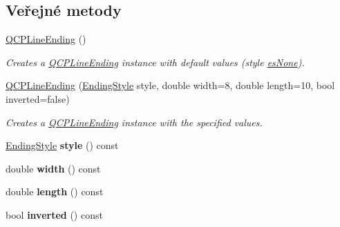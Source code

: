 \subsection*{Veřejné metody}
\begin{DoxyCompactItemize}
\item 
\hypertarget{classQCPLineEnding_af2eaf8123b000d97fbd11929c669f61b}{}\hyperlink{classQCPLineEnding_af2eaf8123b000d97fbd11929c669f61b}{Q\+C\+P\+Line\+Ending} ()\label{classQCPLineEnding_af2eaf8123b000d97fbd11929c669f61b}

\begin{DoxyCompactList}\small\item\em Creates a \hyperlink{classQCPLineEnding}{Q\+C\+P\+Line\+Ending} instance with default values (style \hyperlink{classQCPLineEnding_a5ef16e6876b4b74959c7261d8d4c2cd5aca12d500f50cd6871766801bac30fb03}{es\+None}). \end{DoxyCompactList}\item 
\hypertarget{classQCPLineEnding_abb2abc7542f0c7a3c081d878248896a4}{}\hyperlink{classQCPLineEnding_abb2abc7542f0c7a3c081d878248896a4}{Q\+C\+P\+Line\+Ending} (\hyperlink{classQCPLineEnding_a5ef16e6876b4b74959c7261d8d4c2cd5}{Ending\+Style} style, double width=8, double length=10, bool inverted=false)\label{classQCPLineEnding_abb2abc7542f0c7a3c081d878248896a4}

\begin{DoxyCompactList}\small\item\em Creates a \hyperlink{classQCPLineEnding}{Q\+C\+P\+Line\+Ending} instance with the specified values. \end{DoxyCompactList}\item 
\hypertarget{classQCPLineEnding_aea324dbfddbca9895ca8a3a968671299}{}\hyperlink{classQCPLineEnding_a5ef16e6876b4b74959c7261d8d4c2cd5}{Ending\+Style} {\bfseries style} () const \label{classQCPLineEnding_aea324dbfddbca9895ca8a3a968671299}

\item 
\hypertarget{classQCPLineEnding_a028328ee3fb139a40acaf65fb56edf67}{}double {\bfseries width} () const \label{classQCPLineEnding_a028328ee3fb139a40acaf65fb56edf67}

\item 
\hypertarget{classQCPLineEnding_a1744315d7b73f6e7ead3621e2cb18c28}{}double {\bfseries length} () const \label{classQCPLineEnding_a1744315d7b73f6e7ead3621e2cb18c28}

\item 
\hypertarget{classQCPLineEnding_aa4ffbb182cbc89fc3d92eb348630502c}{}bool {\bfseries inverted} () const \label{classQCPLineEnding_aa4ffbb182cbc89fc3d92eb348630502c}


\end{DoxyCompactItemize}
